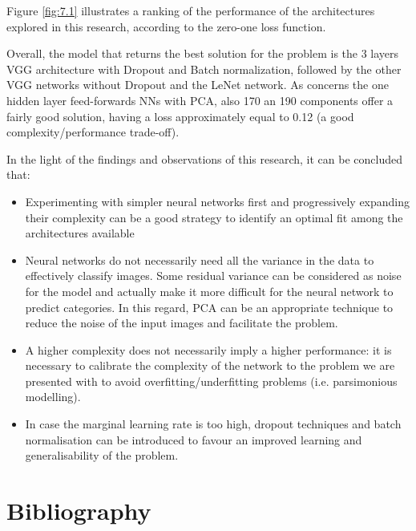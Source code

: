 \documentclass[10pt,english, openany]{book}
\begin{document}
Figure \ref{fig:7.1} illustrates a ranking of the performance of the architectures explored in this research, according to the zero-one loss function.

Overall, the model that returns the best solution for the problem is the 3 layers VGG architecture with Dropout and Batch normalization, followed by the other VGG networks without Dropout and the LeNet network.
As concerns the one hidden layer feed-forwards NNs with PCA, also 170 an 190 components offer a fairly good solution, having a loss approximately equal to 0.12 (a good complexity/performance trade-off).

In the light of the findings and observations of this research, it can be concluded that:

\begin{itemize}
    \item Experimenting with simpler neural networks first and progressively expanding their complexity can be a good strategy to identify an optimal fit among the architectures available
    \item Neural networks do not necessarily need all the variance in the data to effectively classify images. Some residual variance can be considered as noise for the model and actually make it more difficult for the neural network to predict categories. In this regard, PCA can be an appropriate technique to reduce the noise of the input images and facilitate the problem.
    \item A higher complexity does not necessarily imply a higher performance: it is necessary to calibrate the complexity of the network to the problem we are presented with to avoid overfitting/underfitting problems (i.e. parsimonious modelling).
    \item In case the marginal learning rate is too high, dropout techniques and batch normalisation can be introduced to favour an improved learning and generalisability of the problem.
\end{itemize}

\chapter{Bibliography}\label{chapt:bibliografy}
%
%
\printbibliography
\end{document}
